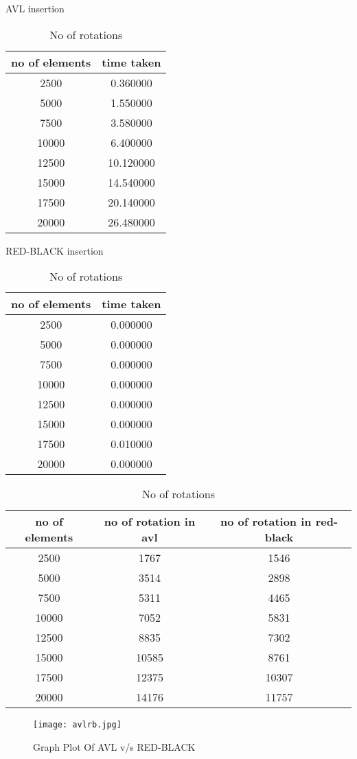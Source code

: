 \documentclass{article}
\begin{document}
\begin{table}[h]
\caption{AVL insertion}
\centering


\begin{tabular}{|c|c|} 
\hline 
\hline 
no of elements  &  time taken \\ 
\hline 
2500 & 0.360000 \\ 
5000 & 1.550000 \\ 
7500 & 3.580000 \\ 
10000 & 6.400000 \\ 
12500 & 10.120000 \\ 
15000 & 14.540000 \\ 
17500 & 20.140000 \\ 
20000 & 26.480000 \\ 
\hline 
\end{tabular}
\caption{RED-BLACK insertion}
\begin{tabular}{|c|c|} 
\hline 
\hline 
no of elements  &  time taken \\ 
\hline 
2500 & 0.000000 \\ 
5000 & 0.000000 \\ 
7500 & 0.000000 \\ 
10000 & 0.000000 \\ 
12500 & 0.000000 \\ 
15000 & 0.000000 \\ 
17500 & 0.010000 \\ 
20000 & 0.000000 \\ 
\hline 
\end{tabular}
\caption{No of rotations} 
\begin{tabular}{|c|c|c|} 
\hline 
\hline 
no of elements  &  no of rotation in avl & no of rotation in red-black \\ 
\hline 
2500 & 1767 & 1546 \\ 
5000 & 3514 & 2898 \\ 
7500 & 5311 & 4465 \\ 
10000 & 7052 & 5831 \\ 
12500 & 8835 & 7302 \\ 
15000 & 10585 & 8761 \\ 
17500 & 12375 & 10307 \\ 
20000 & 14176 & 11757 \\ 
\hline 
\end{tabular}
\end{table}
\begin{figure}
\texttt{[image: avlrb.jpg]}
\caption{Graph Plot Of AVL v/s RED-BLACK}
\end{figure}
\end{document}
